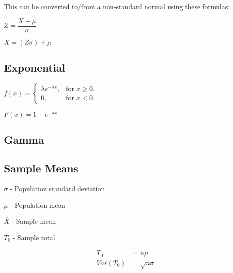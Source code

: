 \documentclass[12pt,fleqn]{article}
\begin{document}
This can be converted to/from a non-standard normal using these formulas:

$Z = \dfrac{X-\mu}{\sigma}$


$X = (Z \sigma) + \mu$


\subsection{Exponential}


$
f(x)=\begin{cases}
\lambda e^{-\lambda x}, & \text{for $x\ge0$}.\\
0, & \text{for $x<0$}.
\end{cases}
$

$ F(x)=1-e^{-\lambda x} $
\subsection{Gamma}


\subsection{Sample Means}

$\sigma$ - Population standard deviation

$\mu$ - Population mean

$\overline{X}$ - Sample mean

$T_0$ - Sample total

\begin{align*}
T_0 &= n\mu\\
Var(T_0) &= \sqrt{n\sigma}
\end{align*}
\end{document}
